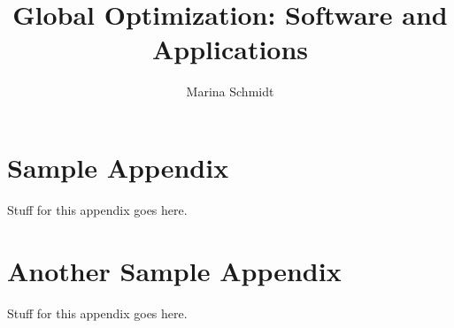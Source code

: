 \documentclass{uofsthesis-cs}
\title{Global Optimization: Software and Applications}
\author{Marina Schmidt}
\begin{document}
\maketitle

\frontmatter














%
%



%

\uofsappendix

\begin{appendices}

\chapter{Sample Appendix}

Stuff for this appendix goes here.

\chapter{Another Sample Appendix}

Stuff for this appendix goes here.

\end{appendices}
\end{document}
